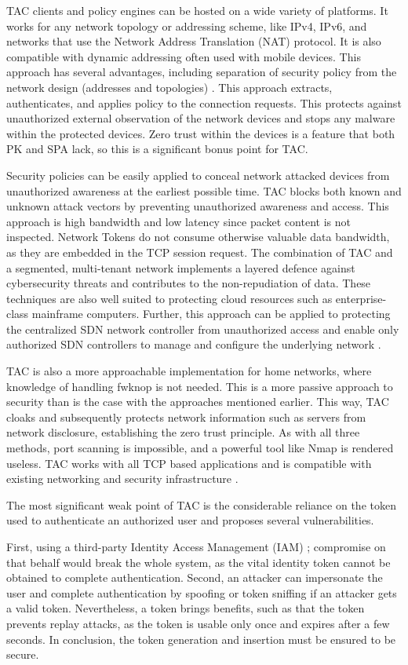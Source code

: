 TAC clients and policy engines can be hosted on a wide variety of platforms.  It works for any network topology or addressing scheme, like IPv4, IPv6, and networks that use the Network Address Translation (NAT) protocol. It is also compatible with dynamic addressing often used with mobile devices. This approach has several advantages, including separation of security policy from the network design (addresses and topologies) \cite{blackridge}. This approach extracts, authenticates, and applies policy to the connection requests. This protects against unauthorized external observation of the network devices and stops any malware within the protected devices.  Zero trust within the devices is a feature that both PK and SPA lack, so this is a significant bonus point for TAC.\par
Security policies can be easily applied to conceal network attacked devices from unauthorized awareness at the earliest possible time.  TAC blocks both known and unknown attack vectors by preventing unauthorized awareness and access.  This approach is high bandwidth and low latency since packet content is not inspected. Network Tokens do not consume otherwise valuable data bandwidth,  as they are embedded in the TCP session request. The combination of TAC and a segmented, multi-tenant network implements a layered defence against cybersecurity threats and contributes to the non-repudiation of data.
These techniques are also well suited to protecting cloud resources such as enterprise-class mainframe computers.  Further, this approach can be applied to protecting the centralized SDN network controller from unauthorized access and enable only authorized SDN controllers to manage and configure the underlying network \cite{blackridge}. \par
TAC is also a more approachable implementation for home networks, where knowledge of handling fwknop is not needed. This is a more passive approach to security than is the case with the approaches mentioned earlier. This way, TAC cloaks and subsequently protects network information such as servers from network disclosure, establishing the zero trust principle. As with all three methods, port scanning is impossible, and a powerful tool like Nmap is rendered useless. TAC works with all TCP based applications and is compatible with existing networking and security infrastructure \cite{blackridge}.\\\par

The most significant weak point of TAC is the considerable reliance on the token used to authenticate an authorized user and proposes several vulnerabilities.\par
First, using a third-party Identity Access Management (IAM) ; compromise on that behalf would break the whole system, as the vital identity token cannot be obtained to complete authentication. Second, an attacker can impersonate the user and complete authentication by spoofing or token sniffing if an attacker gets a valid token. Nevertheless, a token brings benefits, such as that the token prevents replay attacks, as the token is usable only once and expires after a few seconds. In conclusion, the token generation and insertion must be ensured to be secure. \par

